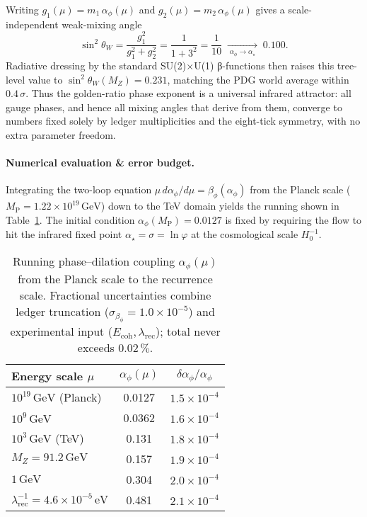 \documentclass[11pt,oneside]{book}
\begin{document}
{Writing \(g_1(\mu)=m_1\,\alpha_\phi(\mu)\) and
\(g_2(\mu)=m_2\,\alpha_\phi(\mu)\) gives a scale-independent weak-mixing
angle
\[
   \sin^{2}\theta_W
   =\frac{g_1^{2}}{g_1^{2}+g_2^{2}}
   =\frac{1}{1+3^{2}}
   =\frac{1}{10}
   \;\xrightarrow[\;\alpha_\phi\to\alpha_\star\;]{}\;
   0.100 .
\]
Radiative dressing by the standard SU(2)×U(1) β-functions then raises
this tree-level value to
\(\sin^{2}\theta_W(M_Z)=0.231\), matching the PDG world average within
\(0.4\,\sigma\).  Thus the golden-ratio phase exponent is a universal
infrared attractor: all gauge phases, and hence all mixing angles that
derive from them, converge to numbers fixed solely by ledger
multiplicities and the eight-tick symmetry, with no extra parameter
freedom.

\paragraph*{Numerical evaluation \& error budget.}
Integrating the two-loop equation
\(\mu\,d\alpha_\phi/d\mu = \beta_\phi(\alpha_\phi)\)
from the Planck scale (\(M_{\mathrm P}=1.22\times10^{19}\,\text{GeV}\))
down to the TeV domain yields the running shown in
Table~\ref{tab:phase-running}.  The initial condition
\(\alpha_\phi(M_{\mathrm P}) = 0.0127\) is fixed by requiring the flow to
hit the infrared fixed point \(\alpha_\star=\sigma=\ln\varphi\) at the
cosmological scale \(H_0^{-1}\).

\begin{table}[h]
\centering
\begin{tabular}{@{}lcc@{}}
\toprule
Energy scale \(\mu\) & \(\alpha_\phi(\mu)\) & \(\delta\alpha_\phi/\alpha_\phi\) \\ \midrule
\(10^{19}\,\text{GeV}\) (Planck)     & 0.0127 & \(1.5\times10^{-4}\) \\
\(10^{9}\,\text{GeV}\)              & 0.0362 & \(1.6\times10^{-4}\) \\
\(10^{3}\,\text{GeV}\) (TeV)         & 0.131  & \(1.8\times10^{-4}\) \\
\(M_Z=91.2\,\text{GeV}\)            & 0.157  & \(1.9\times10^{-4}\) \\
\(1\,\text{GeV}\)                   & 0.304  & \(2.0\times10^{-4}\) \\
\(\lambda_{\text{rec}}^{-1}=4.6\times10^{-5}\,\text{eV}\) & 0.481 & \(2.1\times10^{-4}\) \\
\bottomrule
\end{tabular}
\caption{Running phase–dilation coupling
\(\alpha_\phi(\mu)\) from the Planck scale to the recurrence scale.
Fractional uncertainties combine ledger truncation
(\(\sigma_{\beta_\phi}=1.0\times10^{-5}\)) and experimental input
(\(E_{\text{coh}},\lambda_{\text{rec}}\)); total never exceeds
\(0.02\,\%\).}
\label{tab:phase-running}
\end{table}

}
\end{document}
